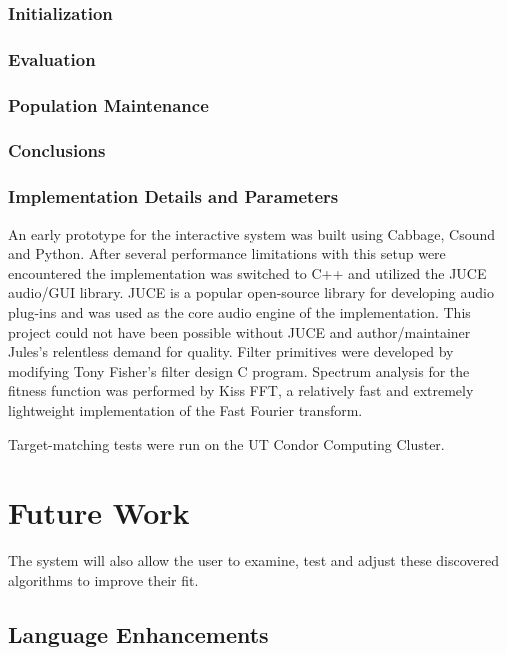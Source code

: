 \documentclass[12pt]{article}
\begin{document}
\subsubsection{Initialization}\label{IGAINIT}
\subsubsection{Evaluation}\label{IGAINIT}
\subsubsection{Population Maintenance}\label{IGAMAINTENANCE}
\subsubsection{Conclusions}\label{IGACONCLUSIONS}
\subsubsection{Implementation Details and Parameters}\label{IGAIMPLEMENTATION}

An early prototype for the interactive system was built using Cabbage, Csound and Python. After several performance limitations with this setup were encountered the implementation was switched to C++ and utilized the JUCE audio/GUI library. JUCE is a popular open-source library for developing audio plug-ins and was used as the core audio engine of the implementation. This project could not have been possible without JUCE and author/maintainer Jules's relentless demand for quality. Filter primitives were developed by modifying Tony Fisher's filter design C program. Spectrum analysis for the fitness function was performed by Kiss FFT, a relatively fast and extremely lightweight implementation of the Fast Fourier transform.

Target-matching tests were run on the UT Condor Computing Cluster. \begin{comment}Interactive evolution tests were run on a variety of different machines. TODO: fill in with actual data \end{comment}

\section{Future Work}
The system will also allow the user to examine, test and adjust these discovered algorithms to improve their fit.

\subsection{Language Enhancements}\label{FUTUREENHANCEMENTS}
\end{document}
